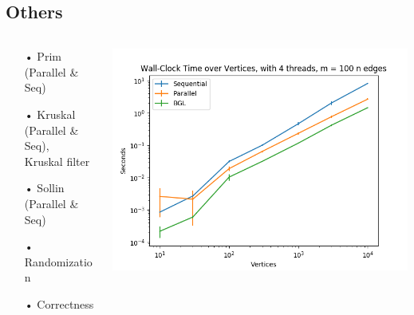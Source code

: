 \documentclass{beamer}
\begin{document}
\subsection{Others}
\begin{frame}
\begin{columns}
\begin{column}{.5\linewidth}
\begin{itemize}
\item[•] Prim (Parallel \& Seq)
\item[•] Kruskal (Parallel \& Seq),\\Kruskal filter
\item[•] Sollin (Parallel \& Seq)
\end{itemize}
\hfill
\hrulefill
\hfill
\begin{itemize}
\item[•] Randomization
\end{itemize}
\hfill
\hrulefill
\hfill
\begin{itemize}
\item[•] Correctness
\end{itemize}
\hfill
\end{column}
\begin{column}{.5\linewidth}
\includegraphics[scale=.23]{Bench.png}
\end{column}
\end{columns}
\end{frame}
\end{document}
